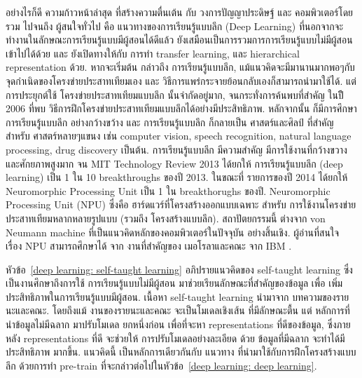 อย่างไรก็ดี ความก้าวหน้าล่าสุด ที่สร้างความตื่นเต้น กับ วงการปัญญาประดิษฐ์ และ คอมพิวเตอร์โดยรวม ไปจนถึง ผู้สนใจทั่วไป คือ แนวทางของการเรียนรู้แบบลึก (Deep Learning) ที่นอกจากจะทำงานในลักษณะการเรียนรู้แบบมีผู้สอนได้ดีแล้ว ยังเสมือนเป็นการรวมการการเรียนรู้แบบไม่มีผู้สอนเข้าไปได้ด้วย และ ยังเปิดทางให้กับ การทำ transfer learning, และ hierarchical representation ด้วย.
หากจะเริ่มต้น กล่าวถึง การเรียนรู้แบบลึก, แม้แนวคิดจะมีมานานมากพอๆกับ จุดกำเนิดของโครงข่ายประสาทเทียมเอง และ วิธีการแพร่กระจายย้อนกลับเองก็สามารถนำมาใช้ได้.
แต่การประยุกต์ใช้ โครงข่ายประสาทเทียมแบบลึก นั้นจำกัดอยู่มาก, จนกระทั่งการค้นพบที่สำคัญ ในปีี 2006 \cite{HintonSalakhutdinov2006a} ที่พบ วิธีการฝึกโครงข่ายประสาทเทียมแบบลึกได้อย่างมีประสิทธิภาพ.
หลักจากนั้น ก็มีการศึกษา การเรียนรู้แบบลึก อย่างกว้างขว้าง และ การเรียนรู้แบบลึก ก็กลายเป็น ศาสตร์และศิลป์ ที่สำคัญ สำหรับ ศาสตร์หลายๆแขนง \cite{Jones2014a, Schmidhuber2015a,MNIST20150311,DahlSainathHinton2013a,DengEtAl2013a, 
ErhanEtAl2010a,CaetanoDosSantoEtAl2015,RamsundarEtAl2015,
ChenEtAl2014a,MaEtAl2015a,XiongEtAl2015a} เช่น computer vision, speech recognition, natural language processing, drug discovery เป็นต้น.
การเรียนรู้แบบลึก มีความสำคัญ มีการใช้งานที่กว้างขวาง และศักยภาพสูงมาก จน
MIT Technology Review 2013 ได้ยกให้ การเรียนรู้แบบลึก (deep learning) เป็น 1 ใน 10 breakthroughs ของปี 2013.
ในขณะที่ รายการของปี 2014 ได้ยกให้ Neuromorphic Processing Unit เป็น 1 ใน breakthorughs ของปี.
Neuromorphic Processing Unit (NPU) \cite{MerollaEtAl2014a} ซึ่งคือ ฮาร์ดแวร์ที่โครงสร้างออกแบบเฉพาะ สำหรับ การใช้งานโครงข่ายประสาทเทียมหลากหลายรูปแบบ (รวมถึง โครงสร้างแบบลึก).
สถาปัตยกรรมนี้ ต่างจาก von Neumann machine ที่เป็นแนวคิดหลักของคอมพิวเตอร์ในปัจจุบัน อย่างสิ้นเชิง.
ผู้อ่านที่สนใจ เรื่อง NPU สามารถศึกษาได้ จาก งานที่สำคัญของ เมอโรลาและคณะ จาก IBM \cite{MerollaEtAl2014a}.

หัวข้อ~\ref{deep learning: self-taught learning} อภิปรายแนวคิดของ self-taught learning ซึ่งเป็นงานศึกษาถึงการใช้ การเรียนรู้แบบไม่มีผู้สอน มาช่วยเรียนลักษณะที่สำคัญของข้อมูล เพื่อ เพิ่มประสิทธิภาพในการเรียนรู้แบบมีผู้สอน.
เนื้อหา self-taught learning นำมาจาก บทความของรายนะและคณะ\cite{RainaEtAl2007a}.
โดยถึงแม้ งานของรายนะและคณะ จะเป็นโมเดลเชิงเส้น ที่มีลักษณะตื้น แต่ หลักการที่ นำข้อมูลไม่มีฉลาก มาปรับโมเดล ยกหนึ่งก่อน เพื่อที่จะหา representations ที่ดีของข้อมูล,
ซึ่งภายหลัง representations ที่ดี จะช่วยให้ การปรับโมเดลอย่างละเอียด ด้วย ข้อมูลที่มีฉลาก จะทำได้มีประสิทธิภาพ มากขึ้น.
แนวคิดนี้ เป็นหลักการเดียวกันกับ แนวทาง ที่นำมาใช้กับการฝึกโครงสร้างแบบลึก ด้วยการทำ pre-train ที่จะกล่าวต่อไปในหัวข้อ~\ref{deep learning: deep learning}.

